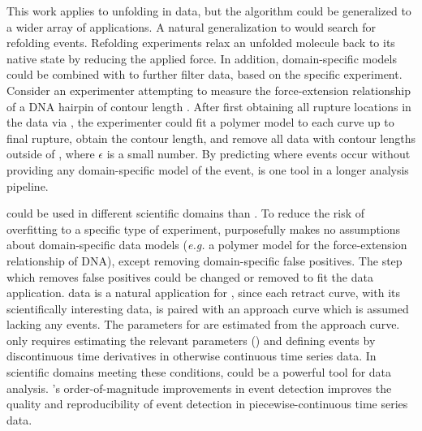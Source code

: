 This work applies \name{} to unfolding in \singlemol{} data, but the algorithm could be generalized to a wider array of applications. A natural generalization to \name{} would search for refolding events. Refolding experiments relax an unfolded molecule back to its native state by reducing the applied force. In addition, domain-specific models could be combined with \name{} to further filter data, based on the specific experiment. Consider an experimenter attempting to measure the force-extension relationship of a DNA hairpin of contour length . After first obtaining all rupture locations in the data via \name{}, the experimenter could fit a polymer model to each curve up to final rupture, obtain the contour length, and remove all data with contour lengths outside of , where $\epsilon$ is a small number. By predicting where events occur without providing any domain-specific model of the event, \name{} is one tool in a longer \singlemol{} analysis pipeline.

\name{} could be used in different scientific domains than \singlemol{}. To reduce the risk of overfitting to a specific type of \singlemol{} experiment, \name{} purposefully makes no assumptions about domain-specific data models (\textit{e.g.} a polymer model for the force-extension relationship of DNA), except removing \singlemol{} domain-specific false positives. The step which removes false positives could be changed or removed to fit the data application. \singlemol{} data is a natural application for \name{}, since each retract curve, with its scientifically interesting data, is paired with an approach curve which is assumed lacking any events. The parameters for \name{} are estimated from the approach curve. \name{} only requires estimating the relevant parameters () and defining events by discontinuous time derivatives in otherwise continuous time series data. In scientific domains meeting these conditions, \name{} could be a powerful tool for data analysis.  \name{}'s order-of-magnitude improvements in event detection improves the quality and reproducibility of event detection in piecewise-continuous time series data.

